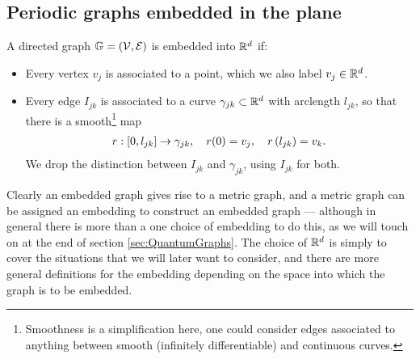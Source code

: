 \subsection{Periodic graphs embedded in the plane} \label{ssec:EmbeddedGraphs}
A directed graph $\mathbb{G}=\left( \mathcal{V}, \mathcal{E} \right)$ is embedded into $\mathbb{R}^d$ if:
\begin{itemize}
	\item Every vertex $v_j$ is associated to a point, which we also label $v_j\in\mathbb{R}^d$.
	\item Every edge $I_{jk}$ is associated to a curve $\gamma_{jk}\subset\mathbb{R}^d$ with arclength $l_{jk}$, so that there is a smooth\footnote{Smoothness is a simplification here, one could consider edges associated to anything between smooth (infinitely differentiable) and continuous curves.} map
	\begin{align} \label{eq:GeneralCurveParam}
		r: \left[ 0,l_{jk} \right] \rightarrow \gamma_{jk}, \quad r(0) = v_j, \quad r\left( l_{jk} \right) = v_k.
	\end{align}
	We drop the distinction between $I_{jk}$ and $\gamma_{jk}$, using $I_{jk}$ for both.
\end{itemize}
Clearly an embedded graph gives rise to a metric graph, and a metric graph can be assigned an embedding to construct an embedded graph --- although in general there is more than a one choice of embedding to do this, as we will touch on at the end of section \ref{sec:QuantumGraphs}.
The choice of $\mathbb{R}^d$ is simply to cover the situations that we will later want to consider, and there are more general definitions for the embedding depending on the space into which the graph is to be embedded.

